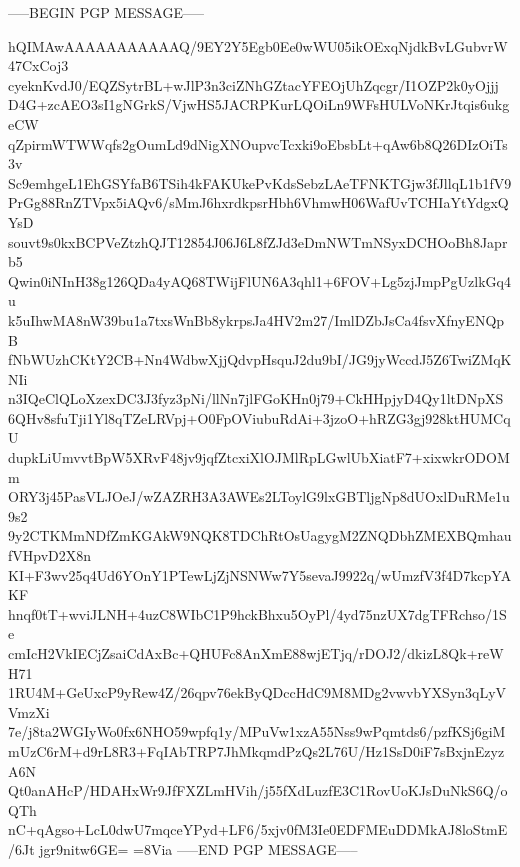 -----BEGIN PGP MESSAGE-----

hQIMAwAAAAAAAAAAAQ/9EY2Y5Egb0Ee0wWU05ikOExqNjdkBvLGubvrW47CxCoj3
cyeknKvdJ0/EQZSytrBL+wJlP3n3ciZNhGZtacYFEOjUhZqcgr/I1OZP2k0yOjjj
D4G+zcAEO3sI1gNGrkS/VjwHS5JACRPKurLQOiLn9WFsHULVoNKrJtqis6ukgeCW
qZpirmWTWWqfs2gOumLd9dNigXNOupvcTcxki9oEbsbLt+qAw6b8Q26DIzOiTs3v
Sc9emhgeL1EhGSYfaB6TSih4kFAKUkePvKdsSebzLAeTFNKTGjw3fJllqL1b1fV9
PrGg88RnZTVpx5iAQv6/sMmJ6hxrdkpsrHbh6VhmwH06WafUvTCHIaYtYdgxQYsD
souvt9s0kxBCPVeZtzhQJT12854J06J6L8fZJd3eDmNWTmNSyxDCHOoBh8Japrb5
Qwin0iNInH38g126QDa4yAQ68TWijFlUN6A3qhl1+6FOV+Lg5zjJmpPgUzlkGq4u
k5uIhwMA8nW39bu1a7txsWnBb8ykrpsJa4HV2m27/ImlDZbJsCa4fsvXfnyENQpB
fNbWUzhCKtY2CB+Nn4WdbwXjjQdvpHsquJ2du9bI/JG9jyWccdJ5Z6TwiZMqKNIi
n3IQeClQLoXzexDC3J3fyz3pNi/llNn7jlFGoKHn0j79+CkHHpjyD4Qy1ltDNpXS
6QHv8sfuTji1Yl8qTZeLRVpj+O0FpOViubuRdAi+3jzoO+hRZG3gj928ktHUMCqU
dupkLiUmvvtBpW5XRvF48jv9jqfZtcxiXlOJMlRpLGwlUbXiatF7+xixwkrODOMm
ORY3j45PasVLJOeJ/wZAZRH3A3AWEs2LToylG9lxGBTljgNp8dUOxlDuRMe1u9s2
9y2CTKMmNDfZmKGAkW9NQK8TDChRtOsUagygM2ZNQDbhZMEXBQmhaufVHpvD2X8n
KI+F3wv25q4Ud6YOnY1PTewLjZjNSNWw7Y5sevaJ9922q/wUmzfV3f4D7kcpYAKF
hnqf0tT+wviJLNH+4uzC8WIbC1P9hckBhxu5OyPl/4yd75nzUX7dgTFRchso/1Se
cmIcH2VkIECjZsaiCdAxBc+QHUFc8AnXmE88wjETjq/rDOJ2/dkizL8Qk+reWH71
1RU4M+GeUxcP9yRew4Z/26qpv76ekByQDccHdC9M8MDg2vwvbYXSyn3qLyVVmzXi
7e/j8ta2WGIyWo0fx6NHO59wpfq1y/MPuVw1xzA55Nss9wPqmtds6/pzfKSj6giM
mUzC6rM+d9rL8R3+FqIAbTRP7JhMkqmdPzQs2L76U/Hz1SsD0iF7sBxjnEzyzA6N
Qt0anAHcP/HDAHxWr9JfFXZLmHVih/j55fXdLuzfE3C1RovUoKJsDuNkS6Q/oQTh
nC+qAgso+LcL0dwU7mqceYPyd+LF6/5xjv0fM3Ie0EDFMEuDDMkAJ8loStmE/6Jt
jgr9nitw6GE=
=8Via
-----END PGP MESSAGE-----
